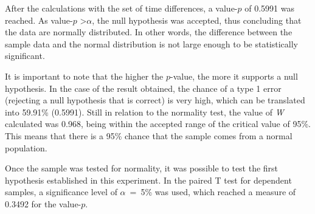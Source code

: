 After the calculations with the set of time differences, a value-$p$ of 0.5991 was reached.
As value-$p$ \textgreater $\alpha$, the null hypothesis was accepted, thus concluding that the data are normally distributed.
In other words, the difference between the sample data and the normal distribution is not large enough to be statistically significant.

It is important to note that the higher the $p$-value, the more it supports a null hypothesis.
In the case of the result obtained, the chance of a type 1 error (rejecting a null hypothesis that is correct) is very high, which can be translated into 59.91\% (0.5991).
Still in relation to the normality test, the value of \textit{W} calculated was 0.968, being within the accepted range of the critical value of 95\%.
This means that there is a 95\% chance that the sample comes from a normal population.

Once the sample was tested for normality, it was possible to test the first hypothesis established in this experiment.
In the paired T test for dependent samples, a significance level of $\alpha$~=~5\% was used, which reached a measure of 0.3492 for the value-$p$.

